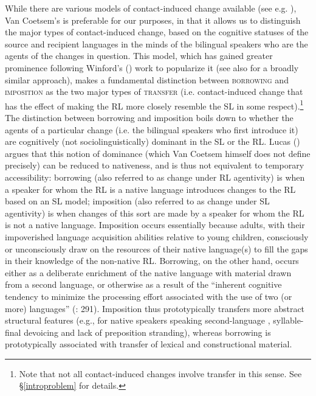 \documentclass[output=paper]{langsci/langscibook}
\begin{document}
While there are various models of contact-induced change available (see e.g. \citealt{ThomasonKaufman1988,Johanson2002,Matras2009}), Van Coetsem's is preferable for our purposes, in that it allows us to distinguish the major types of contact-induced change, based on the cognitive statuses of the source and recipient languages in the minds of the bilingual speakers who are the agents of the changes in question. This model, which has gained greater prominence following Winford's (\citeyear{Winford2005,Winford2007,Winford2010}) work to popularize it (see also \citealt{Ross2013} for a broadly similar approach), makes a fundamental distinction between \textsc{borrowing} and \textsc{imposition} as the two major types of \textsc{transfer} (i.e. contact-induced change that has the effect of making the {RL} more closely resemble the {SL} in some respect).\footnote{Note that not all contact-induced changes involve {transfer} in this sense. See §\ref{introproblem} for details.} The distinction between borrowing and {imposition} boils down to whether the agents of a particular change (i.e. the bilingual speakers who first introduce it) are cognitively (not sociolinguistically) dominant in the {SL} or the {RL}. Lucas (\citeyear{Lucas2012,Lucas2015}) argues that this notion of dominance (which Van Coetsem himself does not define precisely) can be reduced to nativeness, and is thus not equivalent to temporary accessibility: borrowing (also referred to as change under {RL} agentivity) is when a speaker for whom the {RL} is a native language introduces changes to the {RL} based on an {SL} model; {imposition} (also referred to as change under {SL} agentivity) is when changes of this sort are made by a speaker for whom the {RL} is not a native language. Imposition occurs essentially because adults, with their impoverished language acquisition abilities {relative} to young children, consciously or unconsciously draw on the resources of their native language(s) to fill the gaps in their knowledge of the non-native RL. Borrowing, on the other hand, occurs either as a deliberate enrichment of the native language with material drawn from a second language, or otherwise as a result of the ``inherent cognitive tendency to minimize the processing effort associated with the use of two (or more) languages'' (\citealt{Lucas2012}: 291). Imposition thus prototypically transfers more abstract structural features (e.g., for  native speakers speaking second-language , syllable-final {devoicing} and lack of {preposition} stranding), whereas borrowing is prototypically associated with {transfer} of lexical and constructional material.
\end{document}
